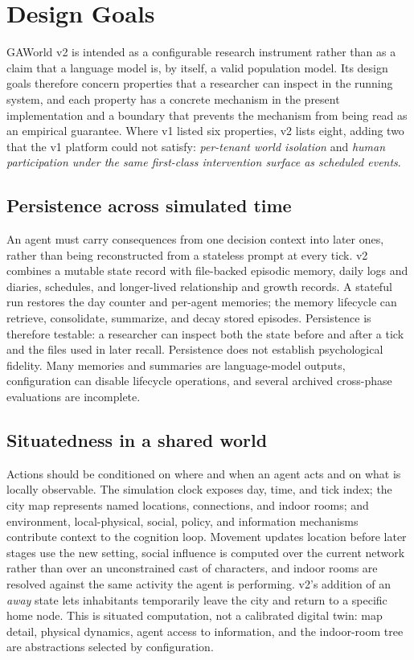 \section{Design Goals}
\label{sec:design-goals}

GAWorld v2 is intended as a configurable research instrument rather than as a
claim that a language model is, by itself, a valid population model.  Its
design goals therefore concern properties that a researcher can inspect in the
running system, and each property has a concrete mechanism in the present
implementation and a boundary that prevents the mechanism from being read as an
empirical guarantee.  Where v1 listed six properties, v2 lists eight, adding
two that the v1 platform could not satisfy: \emph{per-tenant world isolation}
and \emph{human participation under the same first-class intervention surface
as scheduled events}.

\subsection{Persistence across simulated time}
\label{sec:dgo:persistence}

An agent must carry consequences from one decision context into later ones,
rather than being reconstructed from a stateless prompt at every tick.  v2
combines a mutable state record with file-backed episodic memory, daily logs
and diaries, schedules, and longer-lived relationship and growth records.  A
stateful run restores the day counter and per-agent memories; the memory
lifecycle can retrieve, consolidate, summarize, and decay stored episodes.
Persistence is therefore testable: a researcher can inspect both the state
before and after a tick and the files used in later recall.  Persistence does
not establish psychological fidelity.  Many memories and summaries are
language-model outputs, configuration can disable lifecycle operations, and
several archived cross-phase evaluations are incomplete.

\subsection{Situatedness in a shared world}
\label{sec:dgo:situatedness}

Actions should be conditioned on where and when an agent acts and on what is
locally observable.  The simulation clock exposes day, time, and tick index;
the city map represents named locations, connections, and indoor rooms; and
environment, local-physical, social, policy, and information mechanisms
contribute context to the cognition loop.  Movement updates location before
later stages use the new setting, social influence is computed over the
current network rather than over an unconstrained cast of characters, and
indoor rooms are resolved against the same activity the agent is performing.
v2's addition of an \emph{away} state \citep{gaworldtravel} lets inhabitants
temporarily leave the city and return to a specific home node.  This is
situated computation, not a calibrated digital twin: map detail, physical
dynamics, agent access to information, and the indoor-room tree are
abstractions selected by configuration.

